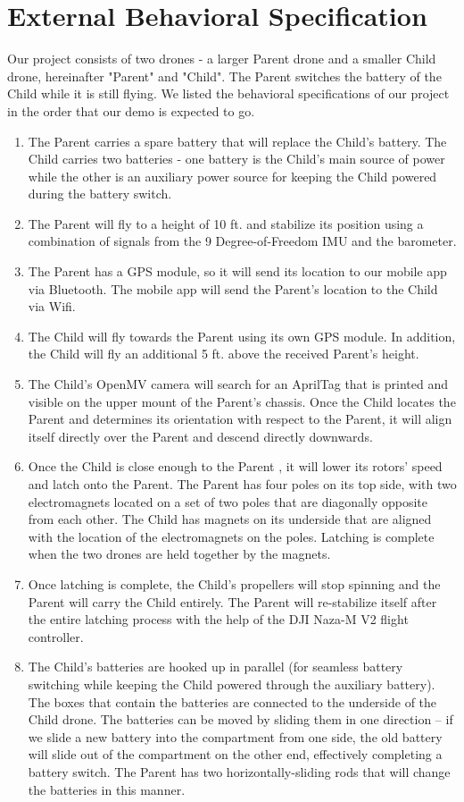 \documentclass[paper=a4, fontsize=10pt]{scrartcl}
\begin{document}
\section{External Behavioral Specification}
Our project consists of two drones - a larger Parent drone and a smaller Child drone, hereinafter "Parent" and "Child". The Parent switches the battery of the Child while it is still flying. We listed the behavioral specifications of our project in the order that our demo is expected to go.
\begin{enumerate}
	\item The Parent carries a spare battery that will replace the Child's battery. The Child carries two batteries - one battery is the Child's main source of power while the other is an auxiliary power source for keeping the Child powered during the battery switch.  
	\item The Parent will fly to a height of 10 ft. and stabilize its position using a combination of signals from the 9 Degree-of-Freedom IMU and the barometer.
	\item The Parent has a GPS module, so it will send its location to our mobile app via Bluetooth. The mobile app will send the Parent's location to the Child via Wifi.
	\item The Child will fly towards the Parent using its own GPS module. In addition, the Child will fly an additional 5 ft. above the received Parent's height.
	\item The Child's OpenMV camera will search for an AprilTag that is printed and visible on the upper mount of the Parent's chassis. Once the Child  locates the Parent and determines its orientation with respect to the Parent, it will align itself directly over the Parent and descend directly downwards.
	\item Once the Child is close enough to the Parent , it will lower its rotors' speed and latch onto the Parent. The Parent has four poles on its top side, with two electromagnets located on a set of two poles that are diagonally opposite from each other. The Child has magnets on its underside that are aligned with the location of the electromagnets on the poles. Latching is complete when the two drones are held together by the magnets. 
	\item Once latching is complete, the Child's propellers will stop spinning and the Parent will carry the Child entirely. The Parent will re-stabilize itself after the entire latching process with the help of the DJI Naza-M V2 flight controller.
	\item The Child's batteries are hooked up in parallel (for seamless battery switching while keeping the Child powered through the auxiliary battery). The boxes that contain the batteries are connected to the underside of the Child drone. The batteries can be moved by sliding them in one direction -- if we slide a new battery into the compartment from one side, the old battery will slide out of the compartment on the other end, effectively completing a battery switch. The Parent has two horizontally-sliding rods that will change the batteries in this manner.

\end{enumerate}
\end{document}
